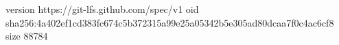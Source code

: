 version https://git-lfs.github.com/spec/v1
oid sha256:4a402ef1cd383fc674c5b372315a99e25a05342b5e305ad80dcaa7f0c4ac6cf8
size 88784
